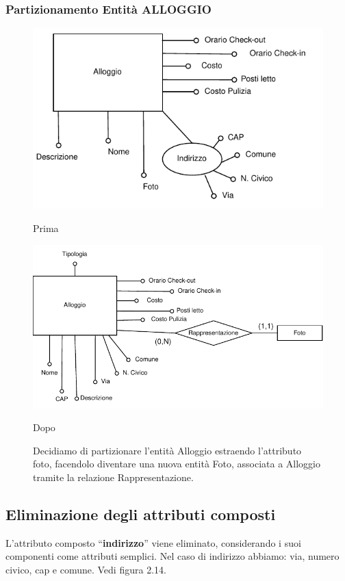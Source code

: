 \subsubsection{Partizionamento Entità ALLOGGIO}
\begin{figure}[H]
      \centering
      \begin{minipage}[b]{0.40\textwidth}
            \includegraphics[width=\textwidth]{resources/pdf/page17.pdf}
            \caption{Prima}
      \end{minipage}
      \hfill
      \begin{minipage}[b]{0.50\textwidth}
            \includegraphics[width=\textwidth]{resources/pdf/page18.pdf}
            \caption{Dopo}
      \end{minipage}
      \caption*{Decidiamo di partizionare l'entità Alloggio estraendo l'attributo foto, facendolo diventare una nuova entità Foto, associata a Alloggio tramite la relazione Rappresentazione.}
\end{figure}

\subsection{Eliminazione degli attributi composti}
L’attributo composto “\textbf{indirizzo}” viene eliminato, considerando i suoi componenti come attributi semplici. Nel caso di indirizzo abbiamo: via, numero civico, cap e comune.
Vedi figura 2.14.